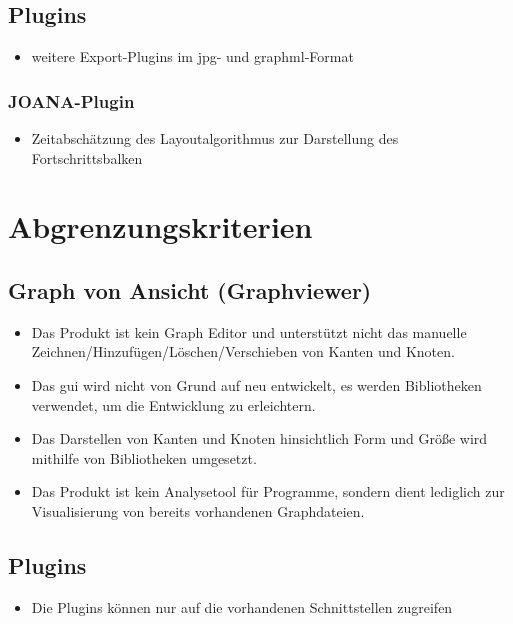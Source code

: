 \subsection{Plugins}
  \begin{itemize}
    \item weitere Export-Plugins im \gls{jpg}- und \gls{graphml}-Format
  \end{itemize}
  
  \subsubsection{JOANA-Plugin}
  \begin{itemize}
    \item Zeitabschätzung des Layoutalgorithmus zur Darstellung des Fortschrittsbalken
  \end{itemize}


\section{Abgrenzungskriterien}

\subsection{Graph von Ansicht (Graphviewer)}
  \begin{itemize}
    \item Das Produkt ist kein Graph Editor und unterstützt nicht das manuelle Zeichnen/Hinzufügen/Löschen/Verschieben von Kanten und Knoten.
    \item Das \gls{gui} wird nicht von Grund auf neu entwickelt, es werden Bibliotheken verwendet, um die Entwicklung zu erleichtern.
    \item Das Darstellen von Kanten und Knoten hinsichtlich Form und Größe wird mithilfe von Bibliotheken umgesetzt.
    \item Das Produkt ist kein Analysetool für Programme, sondern dient lediglich zur Visualisierung von bereits vorhandenen Graphdateien.
  \end{itemize}
\subsection{Plugins}
  \begin{itemize}
    \item Die Plugins können nur auf die vorhandenen Schnittstellen zugreifen %
  \end{itemize}
